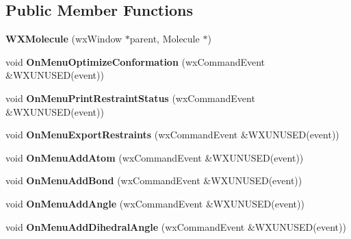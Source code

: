 \subsection*{Public Member Functions}
\begin{DoxyCompactItemize}
\item 
\mbox{\label{class_obj_cryst_1_1_w_x_molecule_a57731ea0ecff7d010fab0ff1c1c32481}} 
{\bfseries W\+X\+Molecule} (wx\+Window $\ast$parent, Molecule $\ast$)
\item 
\mbox{\label{class_obj_cryst_1_1_w_x_molecule_a34831556ec0bdc84b5b7cfe94a934baa}} 
void {\bfseries On\+Menu\+Optimize\+Conformation} (wx\+Command\+Event \&W\+X\+U\+N\+U\+S\+ED(event))
\item 
\mbox{\label{class_obj_cryst_1_1_w_x_molecule_ac209109374534a4ec8d0e61eafdddfe0}} 
void {\bfseries On\+Menu\+Print\+Restraint\+Status} (wx\+Command\+Event \&W\+X\+U\+N\+U\+S\+ED(event))
\item 
\mbox{\label{class_obj_cryst_1_1_w_x_molecule_a078631b978afb54b2b031d6a148bc3a9}} 
void {\bfseries On\+Menu\+Export\+Restraints} (wx\+Command\+Event \&W\+X\+U\+N\+U\+S\+ED(event))
\item 
\mbox{\label{class_obj_cryst_1_1_w_x_molecule_a427efdff9bdcdb346e8ee85baf555257}} 
void {\bfseries On\+Menu\+Add\+Atom} (wx\+Command\+Event \&W\+X\+U\+N\+U\+S\+ED(event))
\item 
\mbox{\label{class_obj_cryst_1_1_w_x_molecule_a1f1372073b5fdb46415ee490fb627869}} 
void {\bfseries On\+Menu\+Add\+Bond} (wx\+Command\+Event \&W\+X\+U\+N\+U\+S\+ED(event))
\item 
\mbox{\label{class_obj_cryst_1_1_w_x_molecule_ad7ee1e9b2e45220a0e58dedbd9ca5b64}} 
void {\bfseries On\+Menu\+Add\+Angle} (wx\+Command\+Event \&W\+X\+U\+N\+U\+S\+ED(event))
\item 
\mbox{\label{class_obj_cryst_1_1_w_x_molecule_ad133de384874dd6fd70c17bb449cf13f}} 
void {\bfseries On\+Menu\+Add\+Dihedral\+Angle} (wx\+Command\+Event \&W\+X\+U\+N\+U\+S\+ED(event))

\end{DoxyCompactItemize}
